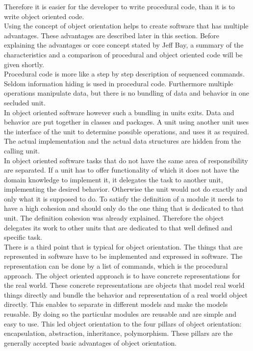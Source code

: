 Therefore it is easier for the developer to write procedural code, than it is to write object oriented code. 
\\

Using the concept of object orientation helps to create software that has multiple advantages. These advantages are described later in this section. Before explaining the advantages or core concept stated by Jeff Bay, a summary of the characteristics and a comparison of procedural and object oriented code will be given shortly. 
\\

Procedural code is more like a step by step description of sequenced commands. 	Seldom information hiding is used in procedural code. Furthermore multiple operations manipulate data, but there is no bundling of data and behavior in one secluded unit. 
\\

In object oriented software however such a bundling in units exits. Data and behavior are put together in classes and packages. A unit using another unit uses the interface of the unit to determine possible operations, and uses it as required. The actual implementation and the actual data structures are hidden from the calling unit.
\\
 
In object oriented software tasks that do not have the same area of responsibility are separated. If a unit has to offer functionality of which it does not have the domain knowledge to implement it, it delegates the task to another unit, implementing the desired behavior. Otherwise the unit would not do exactly and only what it is supposed to do. To satisfy the definition of a module it needs to have a high cohesion and should only do the one thing that is dedicated to that unit. The definition cohesion was already explained. Therefore the object delegates its work to other units that are dedicated to that well defined and specific task. 
\\

There is a third point that is typical for object orientation. The things that are represented in software have to be implemented and expressed in software. The representation can be done by a list of commands, which is the procedural approach. The object oriented approach is to have concrete representations for the real world. These concrete representations are objects that model real world things directly and bundle the behavior and representation of a real world object directly. 
This enables to separate in different models and make the models reusable. By doing so the particular modules are reusable and are simple and easy to use. 
This led object orientation to the four pillars of object orientation: encapsulation, abstraction, inheritance, polymorphism. These pillars are the generally accepted basic advantages of object orientation. \\

